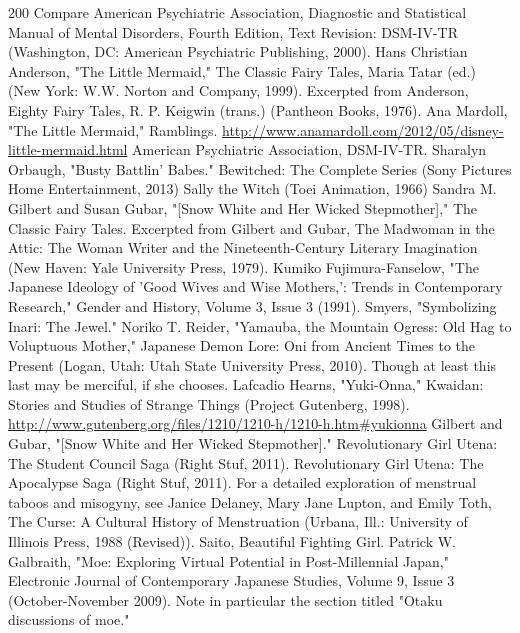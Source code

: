\begin{thebibliography}{200}
    Compare American Psychiatric Association, Diagnostic and Statistical Manual of Mental Disorders, Fourth Edition, Text Revision: DSM-IV-TR (Washington, DC: American Psychiatric Publishing, 2000).
    Hans Christian Anderson, "The Little Mermaid," The Classic Fairy Tales, Maria Tatar (ed.) (New York: W.W. Norton and Company, 1999). Excerpted from Anderson, Eighty Fairy Tales, R. P. Keigwin (trans.) (Pantheon Books, 1976).
    Ana Mardoll, "The Little Mermaid," Ramblings. \url{http://www.anamardoll.com/2012/05/disney-little-mermaid.html}
    American Psychiatric Association, DSM-IV-TR.
    Sharalyn Orbaugh, "Busty Battlin' Babes."
    Bewitched: The Complete Series (Sony Pictures Home Entertainment, 2013)
    Sally the Witch (Toei Animation, 1966)
    Sandra M. Gilbert and Susan Gubar, "[Snow White and Her Wicked Stepmother]," The Classic Fairy Tales. Excerpted from Gilbert and Gubar, The Madwoman in the Attic: The Woman Writer and the Nineteenth-Century Literary Imagination (New Haven: Yale University Press, 1979).
    Kumiko Fujimura-Fanselow, "The Japanese Ideology of 'Good Wives and Wise Mothers,': Trends in Contemporary Research," Gender and History, Volume 3, Issue 3 (1991).
    Smyers, "Symbolizing Inari: The Jewel."
    Noriko T. Reider, "Yamauba, the Mountain Ogress: Old Hag to Voluptuous Mother," Japanese Demon Lore: Oni from Ancient Times to the Present (Logan, Utah: Utah State University Press, 2010).
    Though at least this last may be merciful, if she chooses. Lafcadio Hearns, "Yuki-Onna," Kwaidan: Stories and Studies of Strange Things (Project Gutenberg, 1998). \url{http://www.gutenberg.org/files/1210/1210-h/1210-h.htm#yukionna}
    Gilbert and Gubar, "[Snow White and Her Wicked Stepmother]."
    Revolutionary Girl Utena: The Student Council Saga (Right Stuf, 2011).
    Revolutionary Girl Utena: The Apocalypse Saga (Right Stuf, 2011).
    For a detailed exploration of menstrual taboos and misogyny, see Janice Delaney, Mary Jane Lupton, and Emily Toth, The Curse: A Cultural History of Menstruation (Urbana, Ill.: University of Illinois Press, 1988 (Revised)).
    Saito, Beautiful Fighting Girl.
    Patrick W. Galbraith, "Moe: Exploring Virtual Potential in Post-Millennial Japan," Electronic Journal of Contemporary Japanese Studies, Volume 9, Issue 3 (October-November 2009). Note in particular the section titled "Otaku discussions of moe."

\end{thebibliography}
